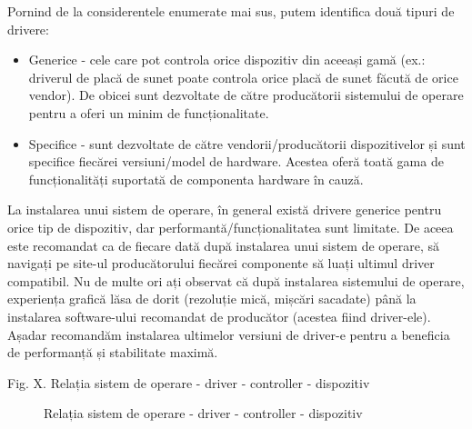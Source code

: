 Pornind de la considerentele enumerate mai sus, putem identifica două tipuri de drivere:

\begin{itemize}
	\item Generice - cele care pot controla orice dispozitiv din aceeași
		gamă (ex.: driverul de placă de sunet poate controla orice placă
		de sunet făcută de orice vendor). De obicei sunt dezvoltate de
		către producătorii sistemului de operare pentru a oferi un minim
		de funcționalitate.
	\item Specifice - sunt dezvoltate de către vendorii/producătorii
		dispozitivelor și sunt specifice fiecărei versiuni/model de
		hardware. Acestea oferă toată gama de funcționalități suportată
		de componenta hardware în cauză.
\end{itemize}


La instalarea unui sistem de operare, în general există drivere generice pentru
orice tip de dispozitiv, dar performantă/funcționalitatea sunt limitate. De
aceea este recomandat ca de fiecare dată după instalarea unui sistem de operare,
să navigați pe site-ul producătorului fiecărei componente să luați ultimul
driver compatibil. Nu de multe ori ați observat că după instalarea sistemului de
operare, experiența grafică lăsa de dorit (rezoluție mică, mișcări sacadate)
până la instalarea software-ului recomandat de producător (acestea fiind
driver-ele). Așadar recomandăm instalarea ultimelor versiuni de driver-e pentru
a beneficia de performanță și stabilitate maximă.

Fig. X. Relația sistem de operare - driver - controller - dispozitiv
\begin{figure}[htbp]
	\centering
	\def\svgwidth{\columnwidth}
	
	\caption{Relația sistem de operare - driver - controller - dispozitiv}
	\label{fig:hw-so-driver}
\end{figure}

